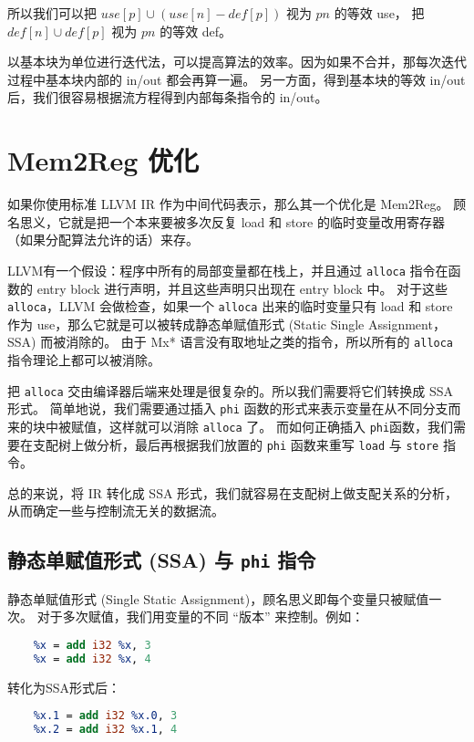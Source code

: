 所以我们可以把 $\mathit{use}[p] \cup (\mathit{use}[n] - \mathit{def}[p])$ 视为 $pn$ 的等效 use，
把 $\mathit{def}[n] \cup \mathit{def}[p]$ 视为 $pn$ 的等效 def。

以基本块为单位进行迭代法，可以提高算法的效率。因为如果不合并，那每次迭代过程中基本块内部的 in/out 都会再算一遍。
另一方面，得到基本块的等效 in/out 后，我们很容易根据流方程得到内部每条指令的 in/out。

\section{Mem2Reg 优化}\label{mem2reg}

如果你使用标准 LLVM IR 作为中间代码表示，那么其一个优化是 Mem2Reg。
顾名思义，它就是把一个本来要被多次反复 load 和 store 的临时变量改用寄存器（如果分配算法允许的话）来存。

LLVM有一个假设：程序中所有的局部变量都在栈上，并且通过 \texttt{alloca} 指令在函数的 entry block
进行声明，并且这些声明只出现在 entry block 中。
对于这些 \texttt{alloca}，LLVM 会做检查，如果一个 \texttt{alloca} 出来的临时变量只有
load 和 store 作为 use，那么它就是可以被转成静态单赋值形式 (Static Single Assignment，SSA) 而被消除的。
由于 Mx* 语言没有取地址之类的指令，所以所有的 \texttt{alloca} 指令理论上都可以被消除。

把 \texttt{alloca} 交由编译器后端来处理是很复杂的。所以我们需要将它们转换成 SSA 形式。
简单地说，我们需要通过插入 \texttt{phi} 函数的形式来表示变量在从不同分支而来的块中被赋值，这样就可以消除
\texttt{alloca} 了。
而如何正确插入 \texttt{phi}函数，我们需要在支配树上做分析，最后再根据我们放置的
\texttt{phi} 函数来重写 \texttt{load} 与 \texttt{store} 指令。

总的来说，将 IR 转化成 SSA 形式，我们就容易在支配树上做支配关系的分析，从而确定一些与控制流无关的数据流。

\subsection{静态单赋值形式 (SSA) 与 \texttt{phi} 指令}

静态单赋值形式 (Single Static Assignment)，顾名思义即每个变量只被赋值一次。
对于多次赋值，我们用变量的不同 “版本” 来控制。例如：
\begin{lstlisting}[language=LLVM]
    %x = add i32 1, 2
    %x = add i32 %x, 3
    %x = add i32 %x, 4
\end{lstlisting}

转化为SSA形式后：
\begin{lstlisting}[language=LLVM]
    %x.0 = add i32 1, 2
    %x.1 = add i32 %x.0, 3
    %x.2 = add i32 %x.1, 4
\end{lstlisting}

